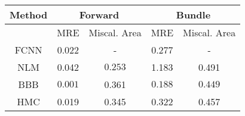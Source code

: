 \documentclass[convert={outext=.png}]{standalone}
\begin{document}
\centering
\label{tab:experimental_results}



\begin{tabular}{c c c c c}
\hline
\hline
Method &  \multicolumn{2}{c}{Forward} & \multicolumn{2}{c}{Bundle} \\ \hline
 & MRE & Miscal. Area & MRE & Miscal. Area\\
 FCNN & 0.022 & - & 0.277 & - \\
 \hline
 NLM & 0.042 & $\mathbf{0.253}$ & 1.183 & 0.491 \\
 BBB & $\mathbf{0.001}$ & 0.361 & $\mathbf{0.188}$ & $\mathbf{0.449}$ \\
 HMC & 0.019 & 0.345 & 0.322 & 0.457 \\
\hline
\hline
\end{tabular}
\end{document}
